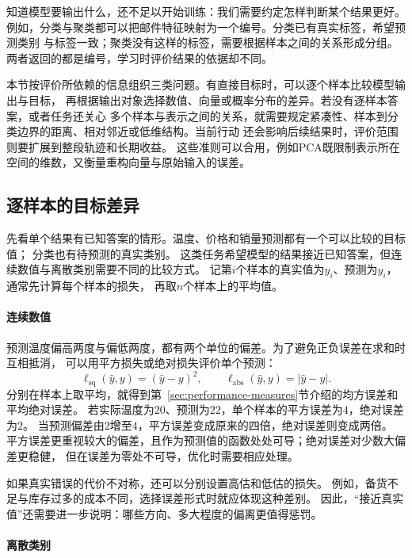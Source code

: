 知道模型要输出什么，还不足以开始训练：我们需要约定怎样判断某个结果更好。
例如，分类与聚类都可以把邮件特征映射为一个编号。分类已有真实标签，希望预测类别
与标签一致；聚类没有这样的标签，需要根据样本之间的关系形成分组。
两者返回的都是编号，学习时评价结果的依据却不同。

本节按评价所依赖的信息组织三类问题。有直接目标时，可以逐个样本比较模型输出与目标，
再根据输出对象选择数值、向量或概率分布的差异。若没有逐样本答案，或者任务还关心
多个样本与表示之间的关系，就需要规定紧凑性、样本到分类边界的距离、相对邻近或低维结构。当前行动
还会影响后续结果时，评价范围则要扩展到整段轨迹和长期收益。
这些准则可以合用，例如PCA既限制表示所在空间的维数，又衡量重构向量与原始输入的误差。

\subsection{逐样本的目标差异}
\label{sec:models-pointwise-objectives}

先看单个结果有已知答案的情形。温度、价格和销量预测都有一个可以比较的目标值；
分类也有待预测的真实类别。
这类任务希望模型的结果接近已知答案，但连续数值与离散类别需要不同的比较方式。
记第$i$个样本的真实值为$y_i$、预测为$\hat{y}_i$，通常先计算每个样本的损失，
再取$n$个样本上的平均值。

\paragraph{连续数值}

预测温度偏高两度与偏低两度，都有两个单位的偏差。为了避免正负误差在求和时互相抵消，
可以用平方损失或绝对损失评价单个预测：
\[
  \ell_{\mathrm{sq}}(\hat y,y)=(\hat y-y)^2,\qquad
  \ell_{\mathrm{abs}}(\hat y,y)=|\hat y-y|.
\]
分别在样本上取平均，就得到第~\ref{sec:performance-measures}节介绍的均方误差和平均绝对误差。
若实际温度为$20$、预测为$22$，单个样本的平方误差为$4$，绝对误差为$2$。
当预测偏差由$2$增至$4$，平方误差变成原来的四倍，绝对误差则变成两倍。
平方误差更重视较大的偏差，且作为预测值的函数处处可导；绝对误差对少数大偏差更稳健，
但在误差为零处不可导，优化时需要相应处理。

如果真实错误的代价不对称，还可以分别设置高估和低估的损失。
例如，备货不足与库存过多的成本不同，选择误差形式时就应体现这种差别。
因此，“接近真实值”还需要进一步说明：哪些方向、多大程度的偏离更值得惩罚。

\paragraph{离散类别}

